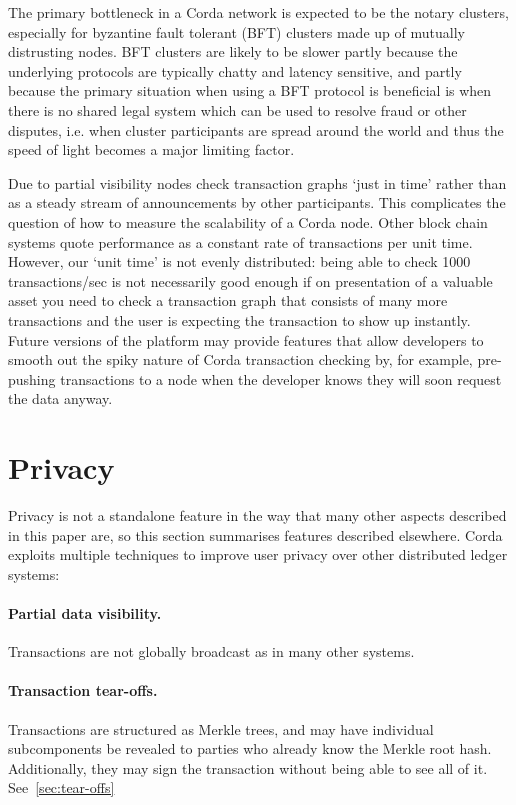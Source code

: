\documentclass{article}
\begin{document}
The primary bottleneck in a Corda network is expected to be the notary clusters, especially for byzantine fault
tolerant (BFT) clusters made up of mutually distrusting nodes. BFT clusters are likely to be slower partly because
the underlying protocols are typically chatty and latency sensitive, and partly because the primary situation when
using a BFT protocol is beneficial is when there is no shared legal system which can be used to resolve fraud or
other disputes, i.e. when cluster participants are spread around the world and thus the speed of light becomes a
major limiting factor.

Due to partial visibility nodes check transaction graphs `just in time' rather than as a steady stream of
announcements by other participants. This complicates the question of how to measure the scalability of a Corda
node. Other block chain systems quote performance as a constant rate of transactions per unit time. However, our
`unit time' is not evenly distributed: being able to check 1000 transactions/sec is not necessarily good enough if
on presentation of a valuable asset you need to check a transaction graph that consists of many more transactions
and the user is expecting the transaction to show up instantly. Future versions of the platform may provide
features that allow developers to smooth out the spiky nature of Corda transaction checking by, for example,
pre-pushing transactions to a node when the developer knows they will soon request the data anyway.

\section{Privacy}\label{sec:privacy}

Privacy is not a standalone feature in the way that many other aspects described in this paper are, so this section
summarises features described elsewhere. Corda exploits multiple techniques to improve user privacy over other
distributed ledger systems:

\paragraph{Partial data visibility.}Transactions are not globally broadcast as in many other systems.
\paragraph{Transaction tear-offs.}Transactions are structured as Merkle trees, and may have individual subcomponents be
revealed to parties who already know the Merkle root hash. Additionally, they may sign the transaction without being
able to see all of it. See~\cref{sec:tear-offs}
\end{document}
